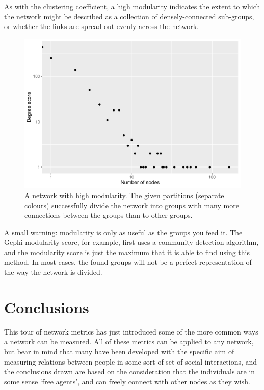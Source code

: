 \documentclass[
]{book}
\begin{document}
As with the clustering coefficient, a high modularity indicates the extent to which the network might be described as a collection of densely-connected sub-groups, or whether the links are spread out evenly across the network.

\begin{figure}
\centering
\includegraphics{_main_files/figure-latex/unnamed-chunk-34-1.pdf}
\caption{\label{fig:unnamed-chunk-34}A network with high modularity. The given partitions (separate colours) successfully divide the network into groups with many more connections between the groups than to other groups.}
\end{figure}

A small warning: modularity is only as useful as the groups you feed it. The Gephi modularity score, for example, first uses a community detection algorithm, and the modularity score is just the maximum that it is able to find using this method. In most cases, the found groups will not be a perfect representation of the way the network is divided.

\hypertarget{conclusions}{%
\section{Conclusions}\label{conclusions}}

This tour of network metrics has just introduced some of the more common ways a network can be measured. All of these metrics can be applied to any network, but bear in mind that many have been developed with the specific aim of measuring relations between people in some sort of set of social interactions, and the conclusions drawn are based on the consideration that the individuals are in some sense `free agents', and can freely connect with other nodes as they wish.
\end{document}
